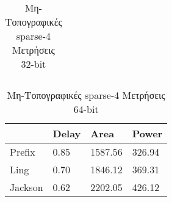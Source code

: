\begin{multicols}{2}
\begin{table}[H]
\begin{tabular}{||p{1.2cm} | p{0.7cm} p{1cm} p{1cm} ||}
        \hline
    \end{tabular}
\caption{Μη-Τοπογραφικές sparse-4 Μετρήσεις 32-bit}
\label{sparse4_result_table_32}
\end{table}
\begin{table}[H]
\centering
     \begin{tabular}{||p{1.2cm} | p{0.7cm} p{1cm} p{1cm} ||} 
        \hline
         & Delay & Area & Power \\ [0.5ex] 
        \hline\hline
        Prefix  & 0.85  & 1587.56    & 326.94 \\ 
        \hline
        Ling    & 0.70  & 1846.12    & 369.31 \\
        \hline
        Jackson & 0.62  & 2202.05    & 426.12 \\
        \hline
    \end{tabular}
\caption{Μη-Τοπογραφικές sparse-4 Μετρήσεις 64-bit}
\label{sparse4_result_table_64}
\end{table}
\end{multicols}
















